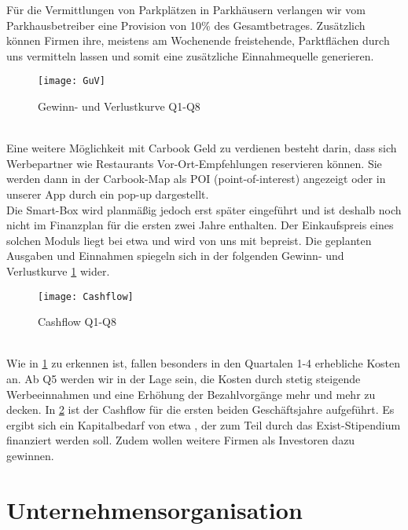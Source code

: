 \documentclass[12pt,ngerman, fleqn]{book} %
\begin{document}
Für die Vermittlungen von Parkplätzen in Parkhäusern verlangen wir vom Parkhausbetreiber eine Provision von 10\% des Gesamtbetrages. 
Zusätzlich können Firmen ihre, meistens am Wochenende freistehende,  Parktflächen durch uns vermitteln lassen und somit eine zusätzliche Einnahmequelle generieren.\\
\begin{figure}[ht]
    \centering
    \texttt{[image: GuV]}
    \caption{Gewinn- und Verlustkurve Q1-Q8}
    \label{fig:GuV}
\end{figure} \\
Eine weitere Möglichkeit mit Carbook Geld zu verdienen besteht darin, dass sich Werbepartner wie Restaurants Vor-Ort-Empfehlungen reservieren können. Sie werden dann in der Carbook-Map als POI (point-of-interest) angezeigt oder in unserer App durch ein pop-up dargestellt.\\
Die Smart-Box wird planmäßig jedoch erst später eingeführt und ist deshalb noch nicht im Finanzplan für die ersten zwei Jahre enthalten. Der Einkaufspreis eines solchen Moduls liegt bei etwa  und wird von uns mit  bepreist.
Die geplanten Ausgaben und Einnahmen spiegeln sich in der folgenden Gewinn- und Verlustkurve \ref{fig:GuV} wider.\\
\begin{figure}[ht]
    \centering
    \texttt{[image: Cashflow]}
    \caption{Cashflow Q1-Q8}
    \label{fig:Cashflow}
\end{figure}\\ 
Wie in \ref{fig:GuV} zu erkennen ist, fallen besonders in den Quartalen 1-4 erhebliche Kosten an. Ab Q5 werden wir in der Lage sein, die Kosten durch stetig steigende Werbeeinnahmen und eine Erhöhung der Bezahlvorgänge mehr und mehr zu decken. In \ref{fig:Cashflow} ist der Cashflow für die ersten beiden Geschäftsjahre aufgeführt. Es ergibt sich ein Kapitalbedarf von etwa , der zum Teil durch das Exist-Stipendium finanziert werden soll. Zudem wollen weitere Firmen als Investoren dazu gewinnen.\newpage

\section {Unternehmensorganisation}
\end{document}
